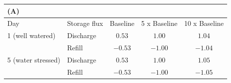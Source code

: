 \begin{tabular}{llccc}
\multicolumn{5}{l}{(A)} \\
\hline
Day & Storage flux & Baseline & 5 x Baseline & 10 x Baseline \\
\hline
1 (well watered) & Discharge & $0.53$ & $1.00$ & $1.04$ \\
 & Refill & $-0.53$ & $-1.00$ & $-1.04$ \\
\hline
5 (water stressed) & Discharge & $0.53$ & $1.00$ & $1.05$ \\
 & Refill & $-0.53$ & $-1.00$ & $-1.05$ \\
\hline
\end{tabular}
